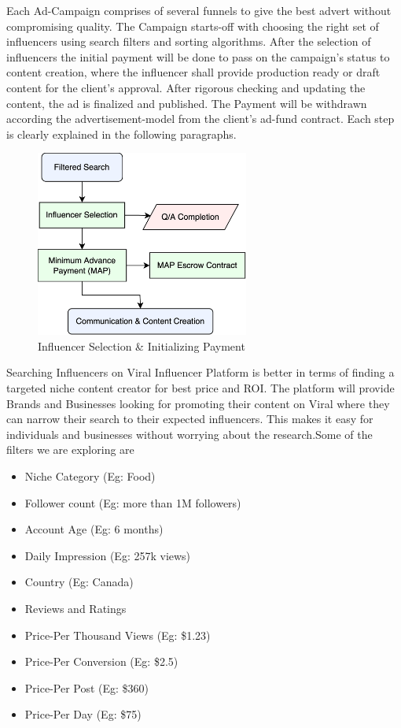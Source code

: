 \documentclass[10pt]{article}
\begin{document}
Each Ad-Campaign comprises of several funnels to give the best advert without compromising quality. The Campaign starts-off with choosing the right set of influencers using search filters and sorting algorithms. After the selection of influencers the initial payment will be done to pass on the campaign's status to content creation, where the influencer shall provide production ready or draft content for the client's approval. After rigorous checking and updating the content, the ad is finalized and published. The Payment will be withdrawn according the advertisement-model from the client's ad-fund contract. Each step is clearly explained in the following paragraphs.\\ 

\begin{figure}[H]
\begin{center}
\includegraphics[width=7cm]{ad-selection}
\caption{Influencer Selection \& Initializing Payment}
\end{center}
\end{figure}

Searching Influencers on Viral Influencer Platform is better in terms of finding a targeted niche content creator for best price and ROI. The platform will provide Brands and Businesses looking for promoting their content on Viral where they can narrow their search to their expected influencers. This makes it easy for individuals and businesses without worrying about the research.Some of the filters we are exploring are
\begin{itemize}[leftmargin=+0.2in]
\item Niche Category (Eg: Food)
\item Follower count (Eg: more than 1M followers)
\item Account Age (Eg: 6 months)
\item Daily Impression (Eg: 257k views)
\item Country (Eg: Canada)
\item Reviews and Ratings
\item Price-Per Thousand Views (Eg: \$1.23)
\item Price-Per Conversion (Eg: \$2.5)
\item Price-Per Post (Eg: \$360)
\item Price-Per Day (Eg: \$75)
\end{itemize}
\end{document}
